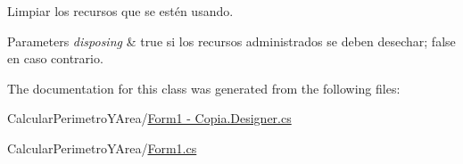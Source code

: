 Limpiar los recursos que se estén usando. 


\begin{DoxyParams}{Parameters}
{\em disposing} & true si los recursos administrados se deben desechar; false en caso contrario.\\
\hline
\end{DoxyParams}


The documentation for this class was generated from the following files\+:\begin{DoxyCompactItemize}
\item 
Calcular\+Perimetro\+Y\+Area/\hyperlink{_form1_01-_01_copia_8_designer_8cs}{Form1 -\/ Copia.\+Designer.\+cs}\item 
Calcular\+Perimetro\+Y\+Area/\hyperlink{_form1_8cs}{Form1.\+cs}\end{DoxyCompactItemize}
